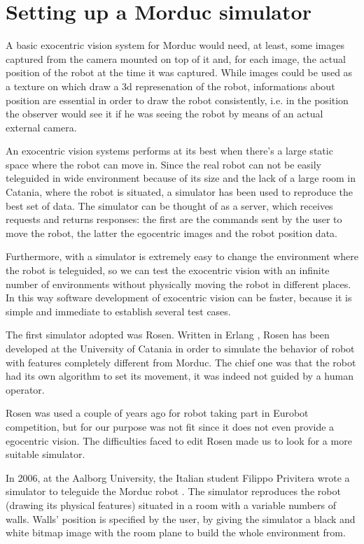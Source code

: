 \section{Setting up a Morduc simulator}
\label{sec:simulator}
A basic exocentric vision system for Morduc would need, 
at least, some images captured from the camera mounted 
on top of it and, for each image, the actual position of 
the robot at the time it was captured.
%
While images could be used as a texture on which draw 
a 3d represenation of the robot, informations about 
position are essential in order to draw the robot 
consistently, i.e. in the position the observer would 
see it if he was seeing the robot by means of an actual 
external camera.
%

%
An exocentric vision systems performs at its best 
when there's a large static space where the robot can move in. Since 
the real robot can not be easily teleguided in wide 
environment because of its size and the lack of a large 
room in Catania, where the robot is situated, a simulator 
has been used to reproduce the best set of data. The 
simulator can be thought of as a server, which receives 
requests and returns responses: the first are the commands 
sent by the user to move the robot, the latter the 
egocentric images and the robot position data.
%

%
Furthermore, with a simulator is extremely easy to 
change the environment where the robot is teleguided, 
so we can test the exocentric vision with an infinite 
number of environments without physically moving the 
robot in different places. In this way software 
development of exocentric vision can be faster, because 
it is simple and immediate to establish several test cases.
%

%
The first simulator adopted was Rosen\cite{rosen}. Written in 
Erlang \cite{erlang}, Rosen has been developed at the University
of Catania in order to simulate the behavior of robot with 
features completely different from Morduc. The chief one 
was that the robot had its own algorithm to set its movement, 
it was indeed not guided by a human operator. 
%

%
Rosen was used a couple of years ago for robot taking part 
in Eurobot competition\cite{eurobot},
but for our purpose was not fit since it does not even 
provide a egocentric vision. The difficulties faced to edit 
Rosen made us to look for a more suitable simulator.
%

%
In 2006, at the Aalborg University, the Italian student Filippo 
Privitera wrote a simulator to teleguide the Morduc robot 
\cite{privitera}. The simulator reproduces the robot (drawing its 
physical features) situated in a room with a variable numbers 
of walls. Walls' position is specified by the user, by giving 
the simulator a black and white bitmap image with the room 
plane to build the whole environment from. 
%

